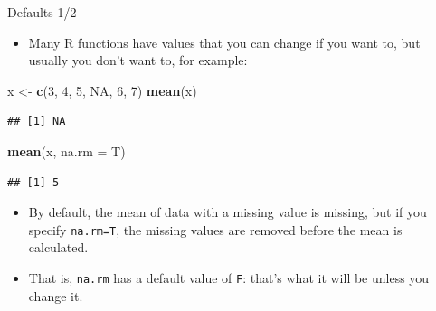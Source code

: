 \documentclass[ignorenonframetext,]{beamer}
\newenvironment{Shaded}{\begin{snugshade}}{\end{snugshade}}
\newcommand{\DataTypeTok}[1]{\textcolor[rgb]{0.13,0.29,0.53}{#1}}
\newcommand{\DecValTok}[1]{\textcolor[rgb]{0.00,0.00,0.81}{#1}}
\newcommand{\KeywordTok}[1]{\textcolor[rgb]{0.13,0.29,0.53}{\textbf{#1}}}
\newcommand{\NormalTok}[1]{#1}
\newcommand{\OtherTok}[1]{\textcolor[rgb]{0.56,0.35,0.01}{#1}}
\newcommand{\StringTok}[1]{\textcolor[rgb]{0.31,0.60,0.02}{#1}}
\providecommand{\tightlist}{%
  \setlength{\itemsep}{0pt}\setlength{\parskip}{0pt}}
\begin{document}
\begin{frame}[fragile]{Defaults 1/2}
\protect\hypertarget{defaults-12}{}

\begin{itemize}
\tightlist
\item
  Many R functions have values that you can change if you want to, but
  usually you don't want to, for example:
\end{itemize}

\begin{Shaded}
\begin{Highlighting}[]
\NormalTok{x <-}\StringTok{ }\KeywordTok{c}\NormalTok{(}\DecValTok{3}\NormalTok{, }\DecValTok{4}\NormalTok{, }\DecValTok{5}\NormalTok{, }\OtherTok{NA}\NormalTok{, }\DecValTok{6}\NormalTok{, }\DecValTok{7}\NormalTok{)}
\KeywordTok{mean}\NormalTok{(x)}
\end{Highlighting}
\end{Shaded}

\begin{verbatim}
## [1] NA
\end{verbatim}

\begin{Shaded}
\begin{Highlighting}[]
\KeywordTok{mean}\NormalTok{(x, }\DataTypeTok{na.rm =}\NormalTok{ T)}
\end{Highlighting}
\end{Shaded}

\begin{verbatim}
## [1] 5
\end{verbatim}

\begin{itemize}
\item
  By default, the mean of data with a missing value is missing, but if
  you specify \texttt{na.rm=T}, the missing values are removed before
  the mean is calculated.
\item
  That is, \texttt{na.rm} has a default value of \texttt{F}: that's what
  it will be unless you change it.
\end{itemize}

\end{frame}
\end{document}
